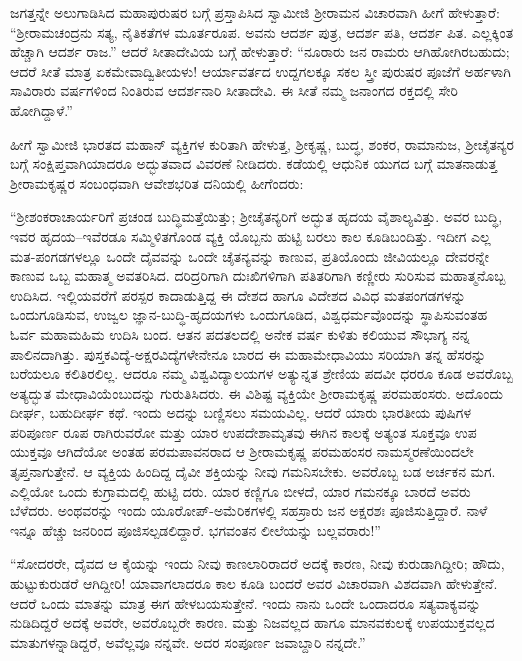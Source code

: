 ಜಗತ್ತನ್ನೇ ಅಲುಗಾಡಿಸಿದ ಮಹಾಪುರುಷರ ಬಗ್ಗೆ ಪ್ರಸ್ತಾಪಿಸಿದ ಸ್ವಾಮೀಜಿ ಶ್ರೀರಾಮನ ವಿಚಾರವಾಗಿ ಹೀಗೆ ಹೇಳುತ್ತಾರೆ: “ಶ್ರೀರಾಮಚಂದ್ರನು ಸತ್ಯ, ನೈತಿಕತೆಗಳ ಮೂರ್ತರೂಪ. ಅವನು ಆದರ್ಶ ಪುತ್ರ, ಆದರ್ಶ ಪತಿ, ಆದರ್ಶ ಪಿತ. ಎಲ್ಲಕ್ಕಿಂತ ಹೆಚ್ಚಾಗಿ ಆದರ್ಶ ರಾಜ.” ಆದರೆ ಸೀತಾದೇವಿಯ ಬಗ್ಗೆ ಹೇಳುತ್ತಾರೆ: “ನೂರಾರು ಜನ ರಾಮರು ಆಗಿಹೋಗಿರಬಹುದು;\\ಆದರೆ ಸೀತೆ ಮಾತ್ರ ಏಕಮೇವಾದ್ವಿತೀಯಳು! ಆರ್ಯಾವರ್ತದ ಉದ್ದಗಲಕ್ಕೂ ಸಕಲ ಸ್ತ್ರೀ ಪುರುಷರ ಪೂಜೆಗೆ ಅರ್ಹಳಾಗಿ ಸಾವಿರಾರು ವರ್ಷಗಳಿಂದ ನಿಂತಿರುವ ಆದರ್ಶನಾರಿ ಸೀತಾದೇವಿ. ಈ ಸೀತೆ ನಮ್ಮ ಜನಾಂಗದ ರಕ್ತದಲ್ಲಿ ಸೇರಿ ಹೋಗಿದ್ದಾಳೆ.”

ಹೀಗೆ ಸ್ವಾಮೀಜಿ ಭಾರತದ ಮಹಾನ್ ವ್ಯಕ್ತಿಗಳ ಕುರಿತಾಗಿ ಹೇಳುತ್ತ, ಶ್ರೀಕೃಷ್ಣ, ಬುದ್ಧ, ಶಂಕರ, ರಾಮಾನುಜ, ಶ್ರೀಚೈತನ್ಯರ ಬಗ್ಗೆ ಸಂಕ್ಷಿಪ್ತವಾಗಿಯಾದರೂ ಅದ್ಭುತವಾದ ವಿವರಣೆ ನೀಡಿದರು. ಕಡೆಯಲ್ಲಿ ಆಧುನಿಕ ಯುಗದ ಬಗ್ಗೆ ಮಾತನಾಡುತ್ತ ಶ್ರೀರಾಮಕೃಷ್ಣರ ಸಂಬಂಧವಾಗಿ ಆವೇಶಭರಿತ ದನಿಯಲ್ಲಿ ಹೀಗೆಂದರು:

“ಶ್ರೀಶಂಕರಾಚಾರ್ಯರಿಗೆ ಪ್ರಚಂಡ ಬುದ್ಧಿಮತ್ತೆಯಿತ್ತು; ಶ್ರೀಚೈತನ್ಯರಿಗೆ ಅದ್ಭುತ ಹೃದಯ ವೈಶಾಲ್ಯವಿತ್ತು. ಅವರ ಬುದ್ಧಿ, ಇವರ ಹೃದಯ–ಇವೆರಡೂ ಸಮ್ಮಿಳಿತಗೊಂಡ ವ್ಯಕ್ತಿ ಯೊಬ್ಬನು ಹುಟ್ಟಿ ಬರಲು ಕಾಲ ಕೂಡಿಬಂದಿತ್ತು. ಇದೀಗ ಎಲ್ಲ ಮತ-ಪಂಗಡಗಳಲ್ಲೂ ಒಂದೇ ದೈವವನ್ನು ಒಂದೇ ಚೈತನ್ಯವನ್ನು ಕಾಣುವ, ಪ್ರತಿಯೊಂದು ಜೀವಿಯಲ್ಲೂ ದೇವರನ್ನೇ ಕಾಣುವ ಒಬ್ಬ ಮಹಾತ್ಮ ಅವತರಿಸಿದ. ದರಿದ್ರರಿಗಾಗಿ ದುಃಖಿಗಳಿಗಾಗಿ ಪತಿತರಿಗಾಗಿ ಕಣ್ಣೀರು ಸುರಿಸುವ ಮಹಾತ್ಮನೊಬ್ಬ ಉದಿಸಿದ. ಇಲ್ಲಿಯವರೆಗೆ ಪರಸ್ಪರ ಕಾದಾಡುತ್ತಿದ್ದ ಈ ದೇಶದ ಹಾಗೂ ವಿದೇಶದ ವಿವಿಧ ಮತಪಂಗಡಗಳನ್ನು ಒಂದುಗೂಡಿಸುವ, ಉಜ್ವಲ ಜ್ಞಾನ-ಬುದ್ಧಿ-ಹೃದಯಗಳು ಒಂದುಗೂಡಿದ, ವಿಶ್ವಧರ್ಮವೊಂದನ್ನು ಸ್ಥಾಪಿಸುವಂತಹ ಓರ್ವ ಮಹಾಮಹಿಮ ಉದಿಸಿ ಬಂದ. ಆತನ ಪದತಲದಲ್ಲಿ ಅನೇಕ ವರ್ಷ ಕುಳಿತು ಕಲಿಯುವ ಸೌಭಾಗ್ಯ ನನ್ನ ಪಾಲಿನದಾಗಿತ್ತು. ಪುಸ್ತಕವಿದ್ಯೆ-ಅಕ್ಷರವಿದ್ಯೆಗಳೇನೇನೂ ಬಾರದ ಈ ಮಹಾಮೇಧಾವಿಯು ಸರಿಯಾಗಿ ತನ್ನ ಹೆಸರನ್ನು ಬರೆಯಲೂ ಕಲಿತಿರಲಿಲ್ಲ. ಆದರೂ ನಮ್ಮ ವಿಶ್ವವಿದ್ಯಾಲಯಗಳ ಅತ್ಯುನ್ನತ ಶ್ರೇಣಿಯ ಪದವೀ ಧರರೂ ಕೂಡ ಅವರೊಬ್ಬ ಅತ್ಯದ್ಭುತ ಮೇಧಾವಿಯೆಂಬುದನ್ನು ಗುರುತಿಸಿದರು. ಈ ವಿಶಿಷ್ಟ ವ್ಯಕ್ತಿಯೇ ಶ್ರೀರಾಮಕೃಷ್ಣ ಪರಮಹಂಸರು. ಅದೊಂದು ದೀರ್ಘ, ಬಹುದೀರ್ಘ ಕಥೆ. ಇಂದು ಅದನ್ನು ಬಣ್ಣಿಸಲು ಸಮಯವಿಲ್ಲ. ಆದರೆ ಯಾರು ಭಾರತೀಯ ಪುಷಿಗಳ ಪರಿಪೂರ್ಣ ರೂಪ ರಾಗಿರುವರೋ ಮತ್ತು ಯಾರ ಉಪದೇಶಾಮೃತವು ಈಗಿನ ಕಾಲಕ್ಕೆ ಅತ್ಯಂತ ಸೂಕ್ತವೂ ಉಪ ಯುಕ್ತವೂ ಆಗಿದೆಯೋ ಅಂತಹ ಪರಮಪಾವನರಾದ ಆ ಶ್ರೀರಾಮಕೃಷ್ಣ ಪರಮಹಂಸರ ನಾಮಸ್ಮರಣೆಯಿಂದಲೇ ತೃಪ್ತನಾಗುತ್ತೇನೆ. ಆ ವ್ಯಕ್ತಿಯ ಹಿಂದಿದ್ದ ದೈವೀ ಶಕ್ತಿಯನ್ನು ನೀವು ಗಮನಿಸಬೇಕು. ಅವರೊಬ್ಬ ಬಡ ಅರ್ಚಕನ ಮಗ. ಎಲ್ಲಿಯೋ ಒಂದು ಕುಗ್ರಾಮದಲ್ಲಿ ಹುಟ್ಟಿ ದರು. ಯಾರ ಕಣ್ಣಿಗೂ ಬೀಳದೆ, ಯಾರ ಗಮನಕ್ಕೂ ಬಾರದೆ ಅವರು ಬೆಳೆದರು. ಅಂಥವರನ್ನು ಇಂದು ಯೂರೋಪ್​-ಅಮೆರಿಕಗಳಲ್ಲಿ ಸಹಸ್ರಾರು ಜನ ಅಕ್ಷರಶಃ ಪೂಜಿಸುತ್ತಿದ್ದಾರೆ. ನಾಳೆ ಇನ್ನೂ ಹೆಚ್ಚು ಜನರಿಂದ ಪೂಜಿಸಲ್ಪಡಲಿದ್ದಾರೆ. ಭಗವಂತನ ಲೀಲೆಯನ್ನು ಬಲ್ಲವರಾರು!”

“ಸೋದರರೇ, ದೈವದ ಆ ಕೈಯನ್ನು ಇಂದು ನೀವು ಕಾಣಲಾರಿರಾದರೆ ಅದಕ್ಕೆ ಕಾರಣ, ನೀವು ಕುರುಡಾಗಿದ್ದೀರಿ; ಹೌದು, ಹುಟ್ಟುಕುರುಡರೆ ಆಗಿದ್ದೀರಿ! ಯಾವಾಗಲಾದರೂ ಕಾಲ ಕೂಡಿ ಬಂದರೆ ಅವರ ವಿಚಾರವಾಗಿ ವಿಶದವಾಗಿ ಹೇಳುತ್ತೇನೆ. ಆದರೆ ಒಂದು ಮಾತನ್ನು ಮಾತ್ರ ಈಗ ಹೇಳಬಯಸುತ್ತೇನೆ. ಇಂದು ನಾನು ಒಂದೇ ಒಂದಾದರೂ ಸತ್ಯವಾಕ್ಯವನ್ನು ನುಡಿದಿದ್ದರೆ ಅದಕ್ಕೆ ಅವರೇ, ಅವರೊಬ್ಬರೇ ಕಾರಣ. ಮತ್ತು ನಿಜವಲ್ಲದ ಹಾಗೂ ಮಾನವಕುಲಕ್ಕೆ ಉಪಯುಕ್ತವಲ್ಲದ ಮಾತುಗಳನ್ನಾಡಿದ್ದರೆ, ಅವೆಲ್ಲವೂ ನನ್ನವೇ. ಅದರ ಸಂಪೂರ್ಣ ಜವಾಬ್ದಾರಿ ನನ್ನದೇ.”

